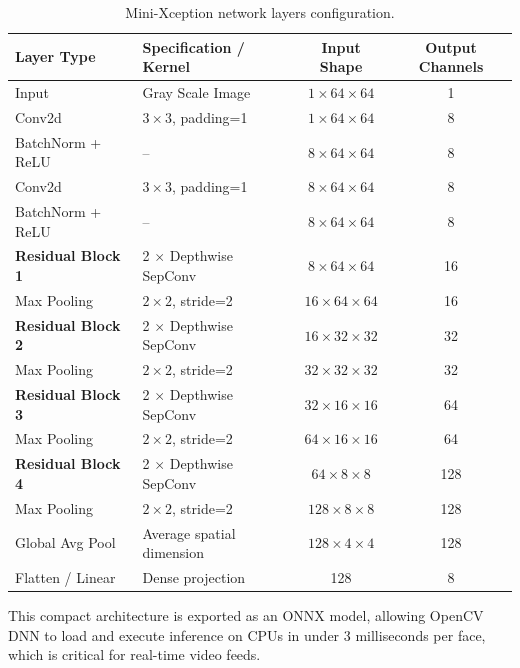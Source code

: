\begin{table}[H]
\centering
\caption{Mini-Xception network layers configuration.}
\label{tab:mini-xception-layers}
\begin{tabular}{llcc}
\toprule
\textbf{Layer Type} & \textbf{Specification / Kernel} & \textbf{Input Shape} & \textbf{Output Channels} \\
\midrule
Input & Gray Scale Image & $1 \times 64 \times 64$ & 1 \\
Conv2d & $3 \times 3$, padding=1 & $1 \times 64 \times 64$ & 8 \\
BatchNorm + ReLU & -- & $8 \times 64 \times 64$ & 8 \\
Conv2d & $3 \times 3$, padding=1 & $8 \times 64 \times 64$ & 8 \\
BatchNorm + ReLU & -- & $8 \times 64 \times 64$ & 8 \\
\midrule
\textbf{Residual Block 1} & 2 $\times$ Depthwise SepConv & $8 \times 64 \times 64$ & 16 \\
Max Pooling & $2 \times 2$, stride=2 & $16 \times 64 \times 64$ & 16 \\
\midrule
\textbf{Residual Block 2} & 2 $\times$ Depthwise SepConv & $16 \times 32 \times 32$ & 32 \\
Max Pooling & $2 \times 2$, stride=2 & $32 \times 32 \times 32$ & 32 \\
\midrule
\textbf{Residual Block 3} & 2 $\times$ Depthwise SepConv & $32 \times 16 \times 16$ & 64 \\
Max Pooling & $2 \times 2$, stride=2 & $64 \times 16 \times 16$ & 64 \\
\midrule
\textbf{Residual Block 4} & 2 $\times$ Depthwise SepConv & $64 \times 8 \times 8$ & 128 \\
Max Pooling & $2 \times 2$, stride=2 & $128 \times 8 \times 8$ & 128 \\
\midrule
Global Avg Pool & Average spatial dimension & $128 \times 4 \times 4$ & 128 \\
Flatten / Linear & Dense projection & 128 & 8 \\
\bottomrule
\end{tabular}
\end{table}
This compact architecture is exported as an ONNX model, allowing OpenCV DNN to load and execute inference on CPUs in under 3 milliseconds per face, which is critical for real-time video feeds.

